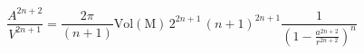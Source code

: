 \begin{equation}
\frac{A^{2n+2}}{V^{2n+1}}=\frac{2\pi}{(n+1)}
{\mathrm{Vol{(M)}}}\,2^{2n+1}\,(n+1)^{2n+1}\frac{1}{\left(1-\frac{a^{2n+2}}{r^{2n+2}}\right)^n}
\end{equation}

